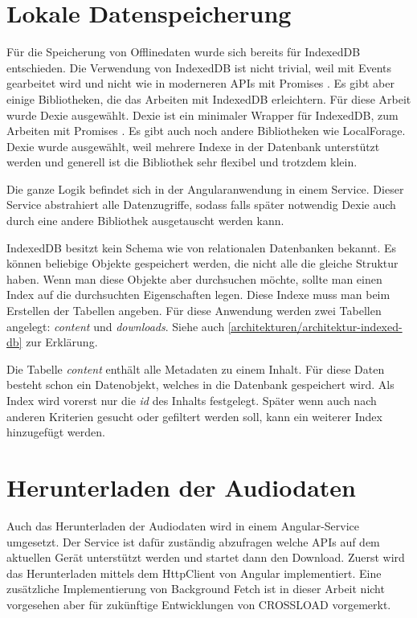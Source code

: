 \section{Lokale Datenspeicherung}
\label{Kap5:Speicherung}
Für die Speicherung von Offlinedaten wurde sich bereits für IndexedDB entschieden. Die Verwendung von IndexedDB ist nicht trivial, weil mit Events gearbeitet wird und nicht wie in moderneren APIs mit Promises \autocite{mdn-indexeddb}. Es gibt aber einige Bibliotheken, die das Arbeiten mit IndexedDB erleichtern. Für diese Arbeit wurde Dexie ausgewählt. Dexie ist ein minimaler Wrapper für IndexedDB, zum Arbeiten mit Promises \autocite{dexie}. Es gibt auch noch andere Bibliotheken wie LocalForage. Dexie wurde ausgewählt, weil mehrere Indexe in der Datenbank unterstützt werden und generell ist die Bibliothek sehr flexibel und trotzdem klein.

Die ganze Logik befindet sich in der Angularanwendung in einem Service. Dieser Service abstrahiert alle Datenzugriffe, sodass falls später notwendig Dexie auch durch eine andere Bibliothek ausgetauscht werden kann. 

IndexedDB besitzt kein Schema wie von relationalen Datenbanken bekannt. Es können beliebige Objekte gespeichert werden, die nicht alle die gleiche Struktur haben. Wenn man diese Objekte aber durchsuchen möchte, sollte man einen Index auf die durchsuchten Eigenschaften legen. Diese Indexe muss man beim Erstellen der Tabellen angeben. Für diese Anwendung werden zwei Tabellen angelegt: \emph{content} und \emph{downloads}. Siehe auch \autoref{architekturen/architektur-indexed-db} zur Erklärung.

Die Tabelle \emph{content} enthält alle Metadaten zu einem Inhalt. Für diese Daten besteht schon ein Datenobjekt, welches in die Datenbank gespeichert wird. Als Index wird vorerst nur die \emph{id} des Inhalts festgelegt. Später wenn auch nach anderen Kriterien gesucht oder gefiltert werden soll, kann ein weiterer Index hinzugefügt werden. 

\section{Herunterladen der Audiodaten}
Auch das Herunterladen der Audiodaten wird in einem Angular-Service umgesetzt. Der Service ist dafür zuständig abzufragen welche APIs auf dem aktuellen Gerät unterstützt werden und startet dann den Download. Zuerst wird das Herunterladen mittels dem HttpClient von Angular implementiert. Eine zusätzliche Implementierung von Background Fetch ist in dieser Arbeit nicht vorgesehen aber für zukünftige Entwicklungen von CROSSLOAD vorgemerkt. 

